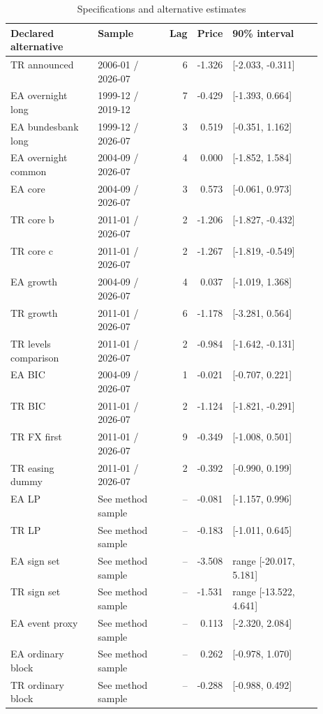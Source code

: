 \begin{table}[htbp]
\centering
\footnotesize
\caption{Specifications and alternative estimates}
\begin{tabularx}{\linewidth}{p{0.29\linewidth}p{0.23\linewidth}rrX}
\toprule
Declared alternative & Sample & Lag & Price & 90\% interval \\
\midrule
TR announced & 2006-01 / 2026-07 & 6 & -1.326 & [-2.033, -0.311] \\
EA overnight long & 1999-12 / 2019-12 & 7 & -0.429 & [-1.393, 0.664] \\
EA bundesbank long & 1999-12 / 2026-07 & 3 & 0.519 & [-0.351, 1.162] \\
EA overnight common & 2004-09 / 2026-07 & 4 & 0.000 & [-1.852, 1.584] \\
EA core & 2004-09 / 2026-07 & 3 & 0.573 & [-0.061, 0.973] \\
TR core b & 2011-01 / 2026-07 & 2 & -1.206 & [-1.827, -0.432] \\
TR core c & 2011-01 / 2026-07 & 2 & -1.267 & [-1.819, -0.549] \\
EA growth & 2004-09 / 2026-07 & 4 & 0.037 & [-1.019, 1.368] \\
TR growth & 2011-01 / 2026-07 & 6 & -1.178 & [-3.281, 0.564] \\
TR levels comparison & 2011-01 / 2026-07 & 2 & -0.984 & [-1.642, -0.131] \\
EA BIC & 2004-09 / 2026-07 & 1 & -0.021 & [-0.707, 0.221] \\
TR BIC & 2011-01 / 2026-07 & 2 & -1.124 & [-1.821, -0.291] \\
TR FX first & 2011-01 / 2026-07 & 9 & -0.349 & [-1.008, 0.501] \\
TR easing dummy & 2011-01 / 2026-07 & 2 & -0.392 & [-0.990, 0.199] \\
EA LP & See method sample & -- & -0.081 & [-1.157, 0.996] \\
TR LP & See method sample & -- & -0.183 & [-1.011, 0.645] \\
EA sign set & See method sample & -- & -3.508 & range [-20.017, 5.181] \\
TR sign set & See method sample & -- & -1.531 & range [-13.522, 4.641] \\
EA event proxy & See method sample & -- & 0.113 & [-2.320, 2.084] \\
EA ordinary block & See method sample & -- & 0.262 & [-0.978, 1.070] \\
TR ordinary block & See method sample & -- & -0.288 & [-0.988, 0.492] \\

\end{tabularx}
\end{table}
